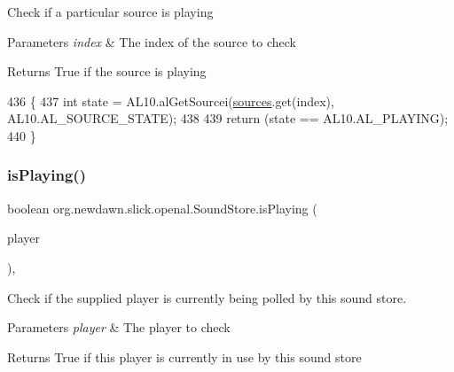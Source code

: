 Check if a particular source is playing


\begin{DoxyParams}{Parameters}
{\em index} & The index of the source to check \\
\hline
\end{DoxyParams}
\begin{DoxyReturn}{Returns}
True if the source is playing 
\end{DoxyReturn}

\begin{DoxyCode}
436                                  \{
437         \textcolor{keywordtype}{int} state = AL10.alGetSourcei(\mbox{\hyperlink{classorg_1_1newdawn_1_1slick_1_1openal_1_1_sound_store_a3a2ffa73acd847102bb30140129c440b}{sources}}.get(index), AL10.AL\_SOURCE\_STATE);
438         
439         \textcolor{keywordflow}{return} (state == AL10.AL\_PLAYING);
440     \}
\end{DoxyCode}
\mbox{\label{classorg_1_1newdawn_1_1slick_1_1openal_1_1_sound_store_a275f068088a5693d51241a42ee3b69a8}} 
\subsubsection{\texorpdfstring{is\+Playing()}{isPlaying()}\hspace{0.1cm}{\footnotesize\ttfamily [2/2]}}
{\footnotesize\ttfamily boolean org.\+newdawn.\+slick.\+openal.\+Sound\+Store.\+is\+Playing (\begin{DoxyParamCaption}\item[{\mbox{\hyperlink{classorg_1_1newdawn_1_1slick_1_1openal_1_1_open_a_l_stream_player}{Open\+A\+L\+Stream\+Player}}}]{player }\end{DoxyParamCaption})\hspace{0.3cm}{\ttfamily [inline]}, {\ttfamily [package]}}

Check if the supplied player is currently being polled by this sound store.


\begin{DoxyParams}{Parameters}
{\em player} & The player to check \\
\hline
\end{DoxyParams}
\begin{DoxyReturn}{Returns}
True if this player is currently in use by this sound store 
\end{DoxyReturn}


